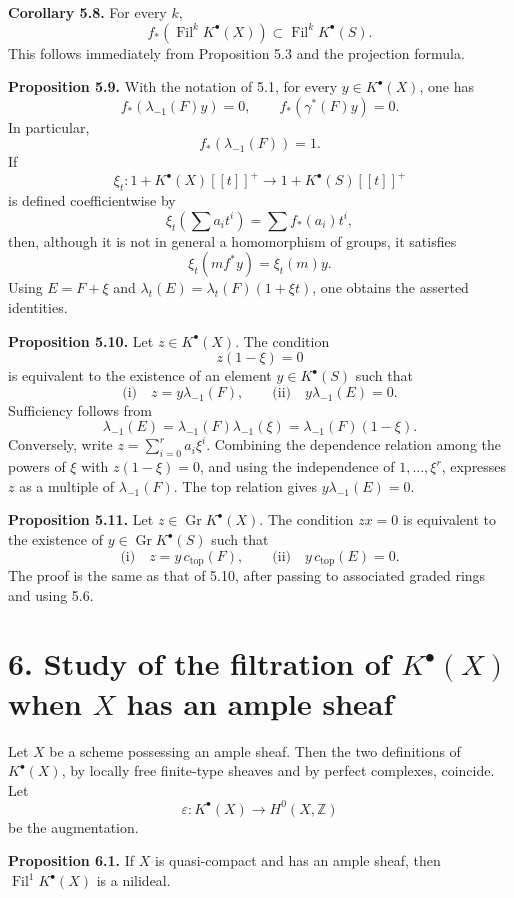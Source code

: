 \documentclass[11pt]{article}
\newcommand{\Gr}{\operatorname{Gr}}
\newcommand{\Fil}{\operatorname{Fil}}
\providecommand{\Gr}{\operatorname{Gr}}
\providecommand{\Gr}{\operatorname{G}}
\begin{document}
\textbf{Corollary 5.8.} For every \(k\),
\[
  f_*(\Fil^k K^\bullet(X))\subset \Fil^k K^\bullet(S).
\]
This follows immediately from Proposition 5.3 and the projection formula.

\textbf{Proposition 5.9.} With the notation of 5.1, for every \(y\in K^\bullet(X)\), one has
\[
  f_*(\lambda_{-1}(F)y)=0,
  \qquad
  f_*(\gamma^*(F)y)=0.
\]
In particular,
\[
  f_*(\lambda_{-1}(F))=1.
\]
If
\[
  \xi_t:1+K^\bullet(X)[[t]]^+\longrightarrow 1+K^\bullet(S)[[t]]^+
\]
is defined coefficientwise by
\[
  \xi_t\left(\sum a_i t^i\right)=\sum f_*(a_i)t^i,
\]
then, although it is not in general a homomorphism of groups, it satisfies
\[
  \xi_t(mf^*y)=\xi_t(m)y.
\]
Using \(E=F+\xi\) and \(\lambda_t(E)=\lambda_t(F)(1+\xi t)\), one obtains the asserted identities.

\textbf{Proposition 5.10.} Let \(z\in K^\bullet(X)\). The condition
\[
  z(1-\xi)=0
\]
is equivalent to the existence of an element \(y\in K^\bullet(S)\) such that
\[
  \text{(i)}\quad z=y\lambda_{-1}(F),
  \qquad
  \text{(ii)}\quad y\lambda_{-1}(E)=0.
\]
Sufficiency follows from
\[
  \lambda_{-1}(E)=\lambda_{-1}(F)\lambda_{-1}(\xi)=\lambda_{-1}(F)(1-\xi).
\]
Conversely, write \(z=\sum_{i=0}^r a_i\xi^i\). Combining the dependence relation among the powers of \(\xi\) with \(z(1-\xi)=0\), and using the independence of \(1,\ldots,\xi^r\), expresses \(z\) as a multiple of \(\lambda_{-1}(F)\). The top relation gives \(y\lambda_{-1}(E)=0\).

\textbf{Proposition 5.11.} Let \(z\in \Gr K^\bullet(X)\). The condition \(zx=0\) is equivalent to the existence of \(y\in \Gr K^\bullet(S)\) such that
\[
  \text{(i)}\quad z=y\,c_{\mathrm{top}}(F),
  \qquad
  \text{(ii)}\quad y\,c_{\mathrm{top}}(E)=0.
\]
The proof is the same as that of 5.10, after passing to associated graded rings and using 5.6.

\section*{6. Study of the filtration of \(K^\bullet(X)\) when \(X\) has an ample sheaf}

Let \(X\) be a scheme possessing an ample sheaf. Then the two definitions of \(K^\bullet(X)\), by locally free finite-type sheaves and by perfect complexes, coincide. Let
\[
  \varepsilon:K^\bullet(X)\longrightarrow H^0(X,\mathbb Z)
\]
be the augmentation.

\textbf{Proposition 6.1.} If \(X\) is quasi-compact and has an ample sheaf, then \(\Fil^1 K^\bullet(X)\) is a nilideal.
\end{document}
